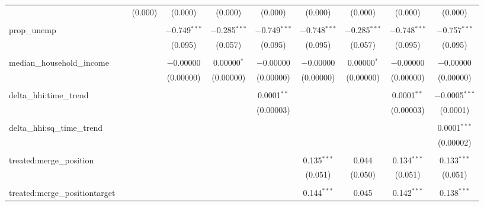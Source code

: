 \begin{table}[H]
{\begin{tabular}{@{\extracolsep{5pt}}lccccccccc}
   &  & (0.000) & (0.000) & (0.000) & (0.000) & (0.000) & (0.000) & (0.000) & (0.000) \\  

   & & & & & & & & & \\  

  prop\_unemp &  &  & $-$0.749$^{***}$ & $-$0.285$^{***}$ & $-$0.749$^{***}$ & $-$0.748$^{***}$ & $-$0.285$^{***}$ & $-$0.748$^{***}$ & $-$0.757$^{***}$ \\  

   &  &  & (0.095) & (0.057) & (0.095) & (0.095) & (0.057) & (0.095) & (0.095) \\  

   & & & & & & & & & \\  

  median\_household\_income &  &  & $-$0.00000 & 0.00000$^{*}$ & $-$0.00000 & $-$0.00000 & 0.00000$^{*}$ & $-$0.00000 & $-$0.00000 \\  

   &  &  & (0.00000) & (0.00000) & (0.00000) & (0.00000) & (0.00000) & (0.00000) & (0.00000) \\  

   & & & & & & & & & \\  

  delta\_hhi:time\_trend &  &  &  &  & 0.0001$^{**}$ &  &  & 0.0001$^{**}$ & $-$0.0005$^{***}$ \\  

   &  &  &  &  & (0.00003) &  &  & (0.00003) & (0.0001) \\  

   & & & & & & & & & \\  

  delta\_hhi:sq\_time\_trend &  &  &  &  &  &  &  &  & 0.0001$^{***}$ \\  

   &  &  &  &  &  &  &  &  & (0.00002) \\  

   & & & & & & & & & \\  

  treated:merge\_position &  &  &  &  &  & 0.135$^{***}$ & 0.044 & 0.134$^{***}$ & 0.133$^{***}$ \\  

   &  &  &  &  &  & (0.051) & (0.050) & (0.051) & (0.051) \\  

   & & & & & & & & & \\  

  treated:merge\_positiontarget &  &  &  &  &  & 0.144$^{***}$ & 0.045 & 0.142$^{***}$ & 0.138$^{***}$ \\  


\end{tabular}}
\end{table}
